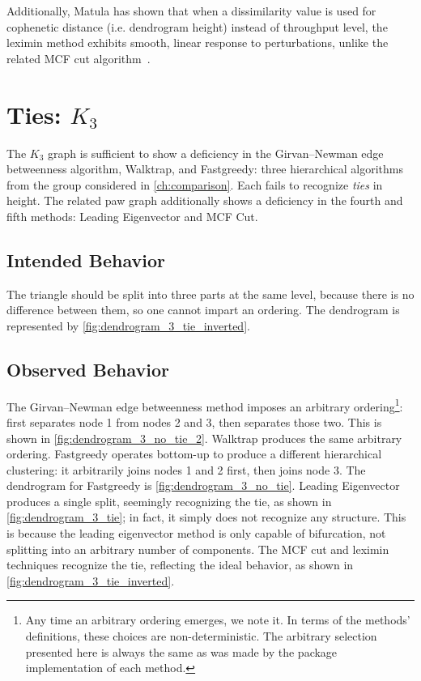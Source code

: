 Additionally, Matula has shown that when a dissimilarity value is used for cophenetic distance (i.e. dendrogram height) instead of throughput level, the leximin method exhibits smooth, linear response to perturbations, unlike the related MCF cut algorithm~\cite{matula1985divisive}.



\section{Ties: $K_3$}

The $K_3$ graph is sufficient to show a deficiency in the Girvan--Newman edge betweenness algorithm, Walktrap, and Fastgreedy: three hierarchical algorithms from the group considered in \autoref{ch:comparison}. Each fails to recognize \emph{ties} in height. The related paw graph additionally shows a deficiency in the fourth and fifth methods: Leading Eigenvector and MCF Cut.



\subsection{Intended Behavior}

The triangle should be split into three parts at the same level, because there is no difference between them, so one cannot impart an ordering. The dendrogram is represented by \autoref{fig:dendrogram_3_tie_inverted}.



\subsection{Observed Behavior}

The Girvan--Newman edge betweenness method imposes an arbitrary ordering\footnote{Any time an arbitrary ordering emerges, we note it. In terms of the methods' definitions, these choices are non-deterministic. The arbitrary selection presented here is always the same as was made by the  package implementation of each method.}: first separates node 1 from nodes 2 and 3, then separates those two. This is shown in \autoref{fig:dendrogram_3_no_tie_2}. Walktrap produces the same arbitrary ordering. Fastgreedy operates bottom-up to produce a different hierarchical clustering: it arbitrarily joins nodes 1 and 2 first, then joins node 3. The dendrogram for Fastgreedy is \autoref{fig:dendrogram_3_no_tie}. Leading Eigenvector produces a single split, seemingly recognizing the tie, as shown in \autoref{fig:dendrogram_3_tie}; in fact, it simply does not recognize any structure. This is because the leading eigenvector method is only capable of bifurcation, not splitting into an arbitrary number of components. The MCF cut and leximin techniques recognize the tie, reflecting the ideal behavior, as shown in \autoref{fig:dendrogram_3_tie_inverted}.

